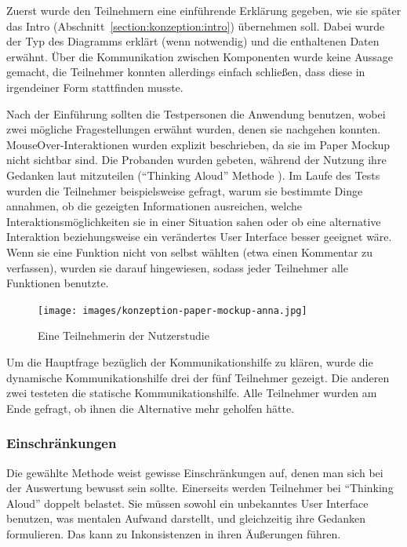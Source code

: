 \documentclass[
	headsepline,
	footsepline,
	fontsize=12pt,
	bibliography=totoc
]{scrbook}
\begin{document}

Zuerst wurde den Teilnehmern eine einführende Erklärung gegeben, wie sie später das Intro (Abschnitt~\ref{section:konzeption:intro}) übernehmen soll. Dabei wurde der Typ des Diagramms erklärt (wenn notwendig) und die enthaltenen Daten erwähnt. Über die Kommunikation zwischen Komponenten wurde keine Aussage gemacht, die Teilnehmer konnten allerdings einfach schließen, dass diese in irgendeiner Form stattfinden musste. 


Nach der Einführung sollten die Testpersonen die Anwendung benutzen, wobei zwei mögliche Fragestellungen erwähnt wurden, denen sie nachgehen konnten. MouseOver-Interaktionen wurden explizit beschrieben, da sie im Paper Mockup nicht sichtbar sind. Die Probanden wurden gebeten, während der Nutzung ihre Gedanken laut mitzuteilen (\enquote{Thinking Aloud} Methode \cite{vanSomeren1994}). Im Laufe des Tests wurden die Teilnehmer beispielsweise gefragt, warum sie bestimmte Dinge annahmen, ob die gezeigten Informationen ausreichen, welche Interaktionsmöglichkeiten sie in einer Situation sahen oder ob eine alternative Interaktion beziehungsweise ein verändertes User Interface besser geeignet wäre. Wenn sie eine Funktion nicht von selbst wählten (etwa einen Kommentar zu verfassen), wurden sie darauf hingewiesen, sodass jeder Teilnehmer alle Funktionen benutzte.

\begin{figure}[htbp]
   \centering
   \texttt{[image: images/konzeption-paper-mockup-anna.jpg]}
   \caption{Eine Teilnehmerin der Nutzerstudie}
   \label{figure:paper-mockup-anna}
\end{figure}

Um die Hauptfrage bezüglich der Kommunikationshilfe zu klären, wurde die dynamische Kommunikationshilfe drei der fünf Teilnehmer gezeigt. Die anderen zwei testeten die statische Kommunikationshilfe. Alle Teilnehmer wurden am Ende gefragt, ob ihnen die Alternative mehr geholfen hätte.

\subsubsection{Einschränkungen}


Die gewählte Methode weist gewisse Einschränkungen auf, denen man sich bei der Auswertung bewusst sein sollte. Einerseits werden Teilnehmer bei \enquote{Thinking Aloud} doppelt belastet. Sie müssen sowohl ein unbekanntes User Interface benutzen, was mentalen Aufwand darstellt, und gleichzeitig ihre Gedanken formulieren. Das kann zu Inkonsistenzen in ihren Äußerungen führen.
\end{document}
